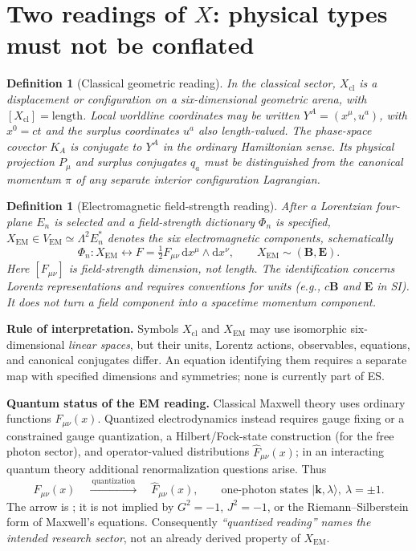 \documentclass[10.5pt,a4paper]{article}
\newtheorem{definition}[proposition]{Definition}
\newcommand{\dd}{\mathrm d}
\newcommand{\Xcl}{X_{\mathrm{cl}}}
\newcommand{\Xem}{X_{\mathrm{EM}}}
\newcommand{\Fhat}{\widehat F}
\newcommand{\st}[1]{\textcolor{muted}{\small\sffamily [#1]}}
\begin{document}
\section{Two readings of $X$: physical types must not be conflated}\label{sec:two}
\begin{definition}[Classical geometric reading]\label{def:xcl}
\st{Axiom / interpretation} In the classical sector, $\Xcl$ is a displacement or configuration on a six-dimensional geometric arena, with $[\Xcl]=\mathrm{length}$. Local worldline coordinates may be written $Y^A=(x^\mu,u^a)$, with $x^0=ct$ and the surplus coordinates $u^a$ also length-valued. The phase-space covector $K_A$ is \emph{conjugate to $Y^A$} in the ordinary Hamiltonian sense. Its physical projection $P_\mu$ and surplus conjugates $q_a$ must be distinguished from the canonical momentum $\pi$ of any separate interior configuration Lagrangian.
\end{definition}
\begin{definition}[Electromagnetic field-strength reading]\label{def:xem}
\st{Axiom / representation} After a Lorentzian four-plane $E_n$ is selected and a field-strength dictionary $\Phi_n$ is specified, $\Xem\in V_{\mathrm{EM}}\simeq\Lambda^2 E_n^*$ denotes the six electromagnetic components, schematically
\begin{equation}\label{eq:Fdict}
   \Phi_n:\Xem\longleftrightarrow F=\tfrac12F_{\mu\nu}\,\dd x^\mu\wedge\dd x^\nu,
   \qquad \Xem\sim(\mathbf B,\mathbf E).
\end{equation}
Here $[F_{\mu\nu}]$ is field-strength dimension, \emph{not} length. The identification concerns Lorentz representations and requires conventions for units (e.g., $c\mathbf B$ and $\mathbf E$ in SI). It does not turn a field component into a spacetime momentum component.
\end{definition}
\begin{resultbox}
\textbf{Rule of interpretation.} Symbols $\Xcl$ and $\Xem$ may use isomorphic six-dimensional \emph{linear spaces}, but their units, Lorentz actions, observables, equations, and canonical conjugates differ. An equation identifying them requires a separate map with specified dimensions and symmetries; none is currently part of ES.
\end{resultbox}
\textbf{Quantum status of the EM reading.} Classical Maxwell theory uses ordinary functions $F_{\mu\nu}(x)$. Quantized electrodynamics instead requires gauge fixing or a constrained gauge quantization, a Hilbert/Fock-state construction (for the free photon sector), and operator-valued distributions $\Fhat_{\mu\nu}(x)$; in an interacting quantum theory additional renormalization questions arise. Thus
\begin{equation}\label{eq:qft}
  F_{\mu\nu}(x)\quad\xrightarrow{\ \text{quantization}\ }\quad
  \Fhat_{\mu\nu}(x),\qquad \text{one-photon states }|\mathbf k,\lambda\rangle,\ \lambda=\pm1.
\end{equation}
The arrow is \st{Open in ES}; it is not implied by $G^2=-1$, $J^2=-1$, or the Riemann--Silberstein form of Maxwell's equations. Consequently \emph{``quantized reading'' names the intended research sector}, not an already derived property of $\Xem$.
\end{document}
